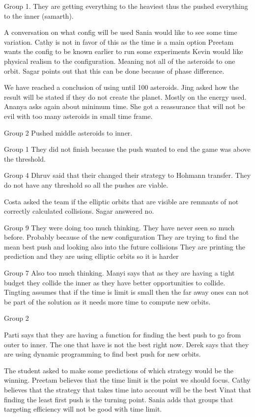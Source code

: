 Group 1.
They are getting everything to the heaviest thus the pushed everything to the inner (samarth).

A conversation on what config will be used
Sania would like to see some time variation.
Cathy is not in favor of this as the time is a main option
Preetam wants the config to be known earlier to run some experiments
Kevin would like physical realism to the configuration. Meaning not all of the asteroids to one orbit.
Sagar points out that this can be done because of phase difference.

We have reached a conclusion of using until 100 asteroids.
Jing asked how the result will be stated if they do not create the planet.
Mostly on the energy used.
Ananya asks again about minimum time.
She got a reassurance that will not be evil with too many asteroids in small time frame.

Group 2
Pushed middle asteroids to inner.

Group 1
They did not finish because the push wanted to end the game was above the threshold.

Group 4
Dhruv said that their changed their strategy to Hohmann transfer. They do not have any threshold so all the pushes are viable.

Costa asked the team if the elliptic orbits that are visible are remnants of not correctly calculated collisions.
Sagar answered no.

Group 9
They were doing too much thinking. They have never seen so much before. Probably because of the new configuration
They are trying to find the mean best push and looking also into the future collisions
They are printing the prediction and they are using elliptic orbits so it is harder

Group 7 
Also too much thinking. Manyi says that as they are having a tight budget they collide the inner as they have better opportunities to collide.
Tingting assumes that if the time is limit is small then the far away ones can not be part of the solution as it needs more time to compute new orbits.

Group 2

Parti says that they are having a function for finding the best push to go from outer to inner.
The one that have is not the best right now.
Derek says that they are using dynamic programming to find best push for new orbits.

The student asked to make some predictions of which strategy would be the winning.
Preetam believes that the time limit is the point we should focus.
Cathy believes that the strategy that takes time into account will be the best
Vinat that finding the least first push is the turning point.
Sania adds that groups that targeting efficiency will not be good with time limit.
